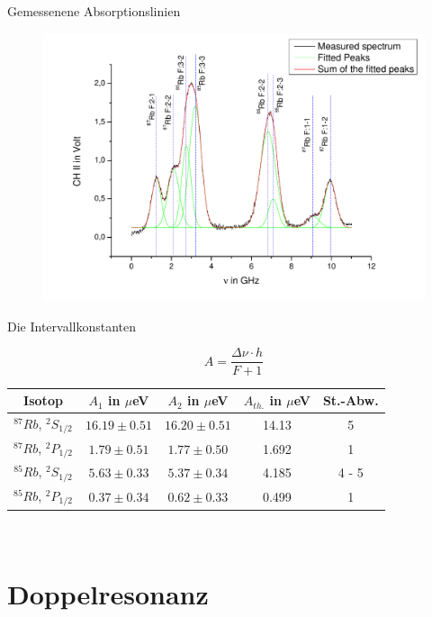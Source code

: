 \documentclass{beamer}
\begin{document}
\begin{frame}[plain]{Gemessenene Absorptionslinien}
	\begin{figure}[H]
	\centering \includegraphics[width=\textwidth]{Bilder/HFSAusw.pdf}
	\end{figure}
\end{frame}

\begin{frame}{Die Intervallkonstanten}

$$A = \frac{\Delta\nu\cdot h}{F+1}$$

\begin{center}
\begin{tabular}[H]{| c | c c c c |} \hline
Isotop & $A_1$ in $\mu$eV & $A_2$ in $\mu$eV & $A_{th.}$ in $\mu$eV & St.-Abw.\\ \hline
$^{87}Rb$, $^2S_{1/2}$ & $16.19 \pm 0.51$ & $16.20 \pm 0.51$ & 14.13  & 5 \\
$^{87}Rb$, $^2P_{1/2}$ & $1.79 \pm 0.51$ &  $1.77 \pm 0.50$ & 1.692   & 1 \\
$^{85}Rb$, $^2S_{1/2}$ & $5.63 \pm 0.33$ &  $5.37 \pm 0.34$ & 4.185   & 4 - 5 \\
$^{85}Rb$, $^2P_{1/2}$ & $0.37 \pm 0.34$ &  $0.62 \pm 0.33$ & 0.499   & 1 \\ \hline
\end{tabular}\\
\end{center}

\end{frame}


\section{Doppelresonanz}
\begin{frame}
\begin{center}
\end{center}
\end{frame}
\end{document}

